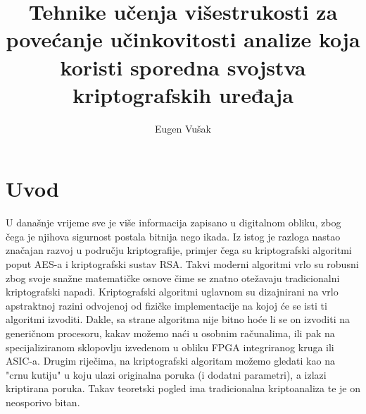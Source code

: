 \documentclass[times, utf8, diplomski]{fer}
\begin{document}

\title{
    Tehnike učenja višestrukosti za povećanje učinkovitosti
    analize koja koristi sporedna svojstva kriptografskih uređaja
}

\author{Eugen Vušak}

\maketitle



\tableofcontents


\chapter{Uvod}
U današnje vrijeme sve je više informacija zapisano u digitalnom obliku, zbog čega je njihova sigurnost postala bitnija nego ikada. Iz istog je razloga nastao značajan razvoj u području kriptografije, primjer čega su kriptografski algoritmi poput AES-a i kriptografski sustav RSA. Takvi moderni algoritmi vrlo su robusni zbog svoje snažne matematičke osnove čime se znatno otežavaju tradicionalni kriptografski napadi. Kriptografski algoritmi uglavnom su dizajnirani na vrlo apstraktnoj razini odvojenoj od fizičke implementacije na kojoj će se isti ti algoritmi izvoditi. Dakle, sa strane algoritma nije bitno hoće li se on izvoditi na generičnom procesoru, kakav možemo naći u osobnim računalima, ili pak na specijaliziranom sklopovlju izvedenom u obliku FPGA integriranog kruga ili ASIC-a. Drugim riječima, na kriptografski algoritam možemo gledati kao na "crnu kutiju" u koju ulazi originalna poruka (i dodatni parametri), a izlazi kriptirana poruka. Takav teoretski pogled ima tradicionalna kriptoanaliza te je on neosporivo bitan.
\end{document}

